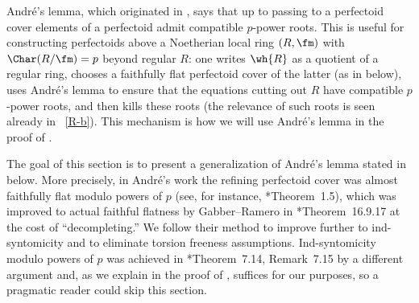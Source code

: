 
 \label{And-lem}






Andr\'{e}'s lemma, which originated in \cite{And18a,And18b}, says that up to passing to a perfectoid cover elements of a perfectoid admit compatible $p$-power roots. This is useful for constructing perfectoids above a Noetherian local ring $(R, \fm)$ with $\Char(R/\fm) = p$ beyond regular $R$: one writes $\wh{R}$ as a quotient of a regular ring, chooses a faithfully flat perfectoid cover of the latter (as in  below), uses Andr\'{e}'s lemma to ensure that the equations cutting out $R$ have compatible $p$-power roots, and then kills these roots (the relevance of such roots %
is seen already in ~\ref{R-b}). This mechanism is how we will use Andr\'{e}'s lemma in the proof of .

The goal of this section is to present a generalization of Andr\'{e}'s lemma stated in  below. %
More precisely, in Andr\'{e}'s work the refining perfectoid cover was almost faithfully flat modulo powers of $p$ (see, for instance, \cite{Bha18a}*{Theorem~1.5}), which was improved to actual faithful flatness by Gabber--Ramero in \cite{GR18}*{Theorem~16.9.17}  at the cost of ``decompleting.'' We follow their method to improve further to ind-syntomicity and to eliminate torsion freeness assumptions. Ind-syntomicity modulo powers of $p$ was achieved in \cite{BS19}*{Theorem~7.14, Remark~7.15} by a different %
argument and, as we explain in the proof of , %
suffices for our purposes, so a pragmatic reader could skip this section. %









